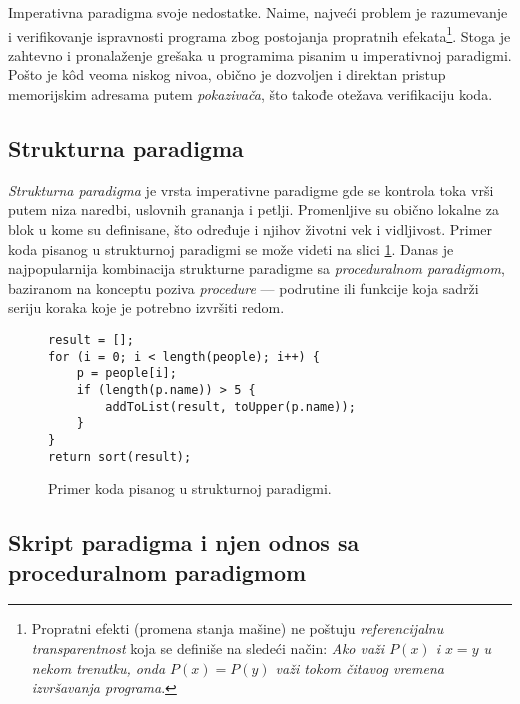 Imperativna paradigma svoje nedostatke. Naime, najveći problem je razumevanje i verifikovanje ispravnosti programa zbog postojanja propratnih efekata\footnote{Propratni efekti (promena stanja mašine) ne poštuju \emph{referencijalnu transparentnost} koja se definiše na sledeći način: \emph{Ako važi $P(x)$ i $x = y$ u nekom trenutku, onda $P(x) = P(y)$ važi tokom čitavog vremena izvršavanja programa}.}. Stoga je zahtevno i pronalaženje grešaka u programima pisanim u imperativnoj paradigmi. Pošto je k\^od veoma niskog nivoa, obično je dozvoljen i direktan pristup memorijskim adresama putem \emph{pokazivača}, što takođe otežava verifikaciju koda.


\subsection{Strukturna paradigma}
\label{subsec:ParadigmImperativeStructural}

\emph{Strukturna paradigma} je vrsta imperativne paradigme gde se kontrola toka vrši putem niza naredbi, uslovnih grananja i petlji. Promenljive su obično lokalne za blok u kome su definisane, što određuje i njihov životni vek i vidljivost. Primer koda pisanog u strukturnoj paradigmi se može videti na slici \ref{fig:ParadigmStructural}. Danas je najpopularnija kombinacija strukturne paradigme sa \emph{proceduralnom paradigmom}, baziranom na konceptu poziva \emph{procedure} --- podrutine ili funkcije koja sadrži seriju koraka koje je potrebno izvršiti redom.

\begin{figure}[h!]
\begin{lstlisting}
result = [];
for (i = 0; i < length(people); i++) {
    p = people[i];
    if (length(p.name)) > 5 {
        addToList(result, toUpper(p.name));
    }
}
return sort(result);
\end{lstlisting}
\caption{Primer koda pisanog u strukturnoj paradigmi.}
\label{fig:ParadigmStructural}
\end{figure}


\subsection{Skript paradigma i njen odnos sa proceduralnom paradigmom}
\label{subsec:Languages}

